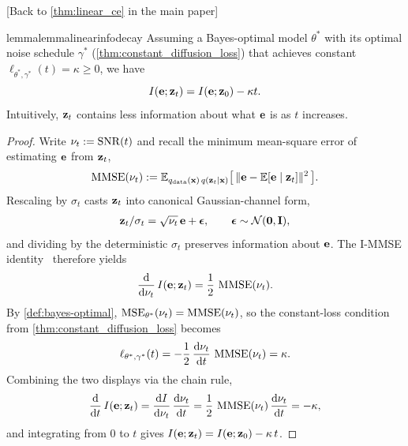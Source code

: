 \documentclass{article}
\begin{document}
[Back to \cref{thm:linear_ce} in the main paper]

\vspace{0.5em}
\begin{restatable}{lemma}{lemmalinearinfodecay}
\label{lemma:linear_info_decay}
Assuming a Bayes-optimal model $\theta^*$ with its optimal noise schedule $\gamma^*$ (\cref{thm:constant_diffusion_loss}) that achieves constant $\ell_{\theta^*, \gamma^*}(t)=\kappa\geq0$, we have
\begin{equation}
    I({\mathbf e}; {\mathbf z}_t) = I({\mathbf e}; {\mathbf z}_0) - \kappa t.
\end{equation}
Intuitively, ${\mathbf z}_t$ contains less information about what ${\mathbf e}$ is as $t$ increases.
\end{restatable}

\begin{proof}
%
Write $\nu_t := {\mathrm{SNR}}(t)$ and recall the minimum mean-square error of estimating ${\mathbf e}$ from ${\mathbf z}_t$,
\begin{align}
    \operatorname{MMSE}(\nu_t) := \mathbb{E}_{q_{\mathrm{data}}({\mathbf x})\,q({\mathbf z}_t \mid {\mathbf x})}\bigl[\,\|{\mathbf e} - \mathbb{E}[{\mathbf e}\mid{\mathbf z}_t]\|^2\,\bigr].
\end{align}
Rescaling by $\sigma_t$ casts ${\mathbf z}_t$ into canonical Gaussian-channel form,
\begin{align}
    {\mathbf z}_t / \sigma_t = \sqrt{\nu_t}\,{\mathbf e} + {\boldsymbol{\epsilon}},
    \qquad {\boldsymbol{\epsilon}} \sim \mathcal{N}({\mathbf 0}, {\mathbf I}),
\end{align}
and dividing by the deterministic $\sigma_t$ preserves information about ${\mathbf e}$. The I-MMSE identity~\citep[Thm.~2]{guo2005mutual} therefore yields
\begin{align}
    \frac{{\mathrm{d}}}{{\mathrm{d}} \nu_t}\,I({\mathbf e};{\mathbf z}_t)
    = \frac{1}{2}\,\operatorname{MMSE}(\nu_t).
\end{align}
By \cref{def:bayes-optimal}, $\operatorname{MSE}_{\theta^*}(\nu_t)=\operatorname{MMSE}(\nu_t)$, so the constant-loss condition from \cref{thm:constant_diffusion_loss} becomes
\begin{align}
    \ell_{\theta^*,\gamma^*}(t)
    = -\frac{1}{2}\,\frac{{\mathrm{d}}\nu_t}{{\mathrm{d}} t}\,\operatorname{MMSE}(\nu_t)
    = \kappa.
\end{align}
%
Combining the two displays via the chain rule,
\begin{align}
    \frac{{\mathrm{d}}}{{\mathrm{d}} t}\,I({\mathbf e};{\mathbf z}_t)
    = \frac{{\mathrm{d}} I}{{\mathrm{d}} \nu_t}\,\frac{{\mathrm{d}} \nu_t}{{\mathrm{d}} t}
    = \frac{1}{2}\,\operatorname{MMSE}(\nu_t)\,\frac{{\mathrm{d}} \nu_t}{{\mathrm{d}} t}
    = -\kappa,
\end{align}
and integrating from $0$ to $t$ gives $I({\mathbf e};{\mathbf z}_t) = I({\mathbf e};{\mathbf z}_0) - \kappa\,t$.
\end{proof}
\end{document}
